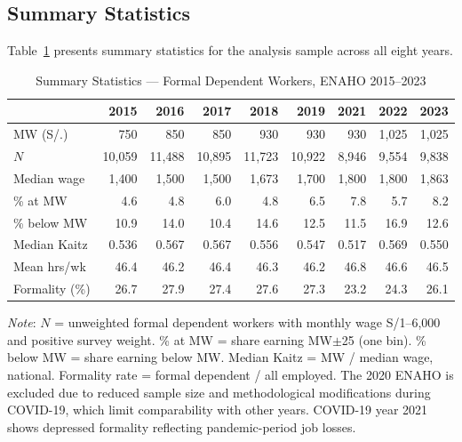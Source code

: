 \documentclass[12pt]{article}
\begin{document}
\subsection{Summary Statistics}

Table~\ref{tab:summary} presents summary statistics for the analysis sample across all eight years.

\begin{table}[H]
\centering
\caption{Summary Statistics --- Formal Dependent Workers, ENAHO 2015--2023}
\label{tab:summary}
\begin{threeparttable}
\small
\begin{tabular}{lrrrrrrrr}
\toprule
 & 2015 & 2016 & 2017 & 2018 & 2019 & 2021 & 2022 & 2023 \\
\midrule
MW (S/.) & 750 & 850 & 850 & 930 & 930 & 930 & 1,025 & 1,025 \\
$N$ & 10,059 & 11,488 & 10,895 & 11,723 & 10,922 & 8,946 & 9,554 & 9,838 \\
Median wage & 1,400 & 1,500 & 1,500 & 1,673 & 1,700 & 1,800 & 1,800 & 1,863 \\
\% at MW & 4.6 & 4.8 & 6.0 & 4.8 & 6.5 & 7.8 & 5.7 & 8.2 \\
\% below MW & 10.9 & 14.0 & 10.4 & 14.6 & 12.5 & 11.5 & 16.9 & 12.6 \\
Median Kaitz & 0.536 & 0.567 & 0.567 & 0.556 & 0.547 & 0.517 & 0.569 & 0.550 \\
Mean hrs/wk & 46.4 & 46.2 & 46.4 & 46.3 & 46.2 & 46.8 & 46.6 & 46.5 \\
Formality (\%) & 26.7 & 27.9 & 27.4 & 27.6 & 27.3 & 23.2 & 24.3 & 26.1 \\
\bottomrule
\end{tabular}
\begin{tablenotes}
\small
\item \textit{Note}: $N$ = unweighted formal dependent workers with monthly wage S/1--6,000 and positive survey weight. \% at MW = share earning MW$\pm$25 (one bin). \% below MW = share earning below MW. Median Kaitz = MW / median wage, national. Formality rate = formal dependent / all employed. The 2020 ENAHO is excluded due to reduced sample size and methodological modifications during COVID-19, which limit comparability with other years. COVID-19 year 2021 shows depressed formality reflecting pandemic-period job losses.
\end{tablenotes}
\end{threeparttable}
\end{table}
\end{document}
